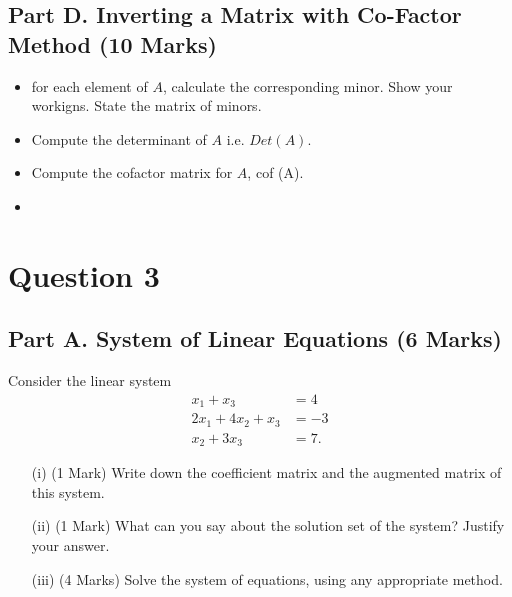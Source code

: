 \documentclass[a4paper,12pt]{article}
\begin{document}
	\subsection*{Part D. Inverting a Matrix with Co-Factor Method (10
		 Marks)}		
	\begin{itemize}
		\item for each element of $A$, calculate the corresponding minor. Show your workigns. 
		State the matrix of minors.
		\item Compute the determinant of $A$ i.e. $Det(A)$.
		\item Compute the cofactor matrix for $A$, cof (A).
		\item
	\end{itemize}
\newpage
\section*{Question 3}
	\subsection*{Part A. System of Linear Equations (6 Marks)}
 Consider the linear system
		\begin{align*}
		x_1 + x_3 &= 4\\
		2x_1 + 4x_2 + x_3 &= -3\\
		x_2 + 3x_3 &= 7.
		\end{align*}
		\begin{itemize}
			\item[(i)] (1 Mark) Write down the coefficient matrix and the augmented matrix of this system. %
			
			\item[(ii)] (1 Mark) What can you say about the solution set of the system? Justify your answer. %
			
			\item[(iii)] (4 Marks) Solve the system of equations, using any appropriate method. %
		\end{itemize}
\end{document}

